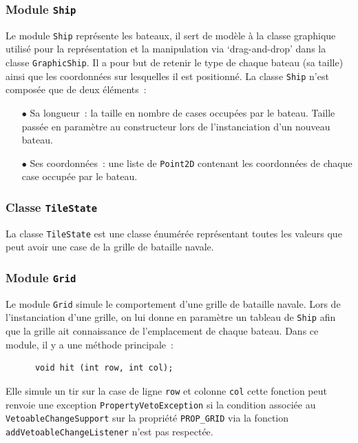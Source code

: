 \documentclass[12pt]{article}
\begin{document}
\bigskip

\subsubsection{Module \texttt{Ship}}

Le module \texttt{Ship} représente les bateaux, il sert de modèle à la classe
graphique utilisé pour la représentation et la manipulation via `drag-and-drop'
dans la classe \texttt{GraphicShip}. Il a pour but de retenir le type de
chaque bateau (sa taille) ainsi que les coordonnées sur lesquelles il est
positionné. La classe \texttt{Ship} n'est composée que de deux éléments :
\begin{itemize}
      \item[$\bullet$] Sa longueur : la taille en nombre de cases occupées par
            le bateau.
            Taille passée en paramètre au constructeur lors de l'instanciation
            d'un nouveau
            bateau.
            \bigskip
      \item[$\bullet$] Ses coordonnées : une liste de \texttt{Point2D}
            contenant
            les
            coordonnées
            de chaque case occupée par le bateau.
\end{itemize}

\bigskip

\subsubsection{Classe \texttt{TileState}}

La classe \texttt{TileState} est une classe énumérée représentant toutes les
valeurs que peut avoir une case de la grille de bataille navale.

\bigskip

\subsubsection{Module \texttt{Grid}}

Le module \texttt{Grid} simule le comportement d'une grille de bataille navale.
Lors de l'instanciation d'une grille, on lui donne en paramètre un tableau de
\texttt{Ship} afin que la grille ait connaissance de l'emplacement de chaque
bateau. Dans ce module, il y a une méthode principale :
\begin{verbatim}
      void hit (int row, int col);
\end{verbatim}
Elle simule un tir sur la case de ligne \texttt{row} et colonne
\texttt{col} cette fonction peut renvoie une exception
\texttt{PropertyVetoException} si la condition associée au
\texttt{VetoableChangeSupport} sur la propriété \texttt{PROP\_GRID} via la
fonction
\texttt{addVetoableChangeListener} n'est pas respectée.
\end{document}
